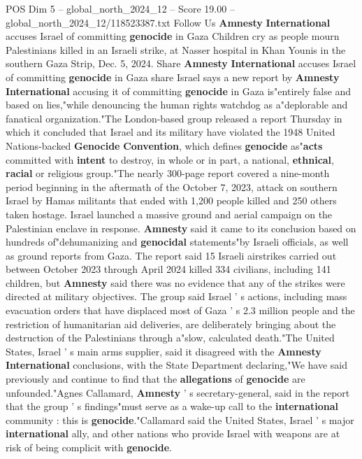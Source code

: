 \begin{textsample}{POS Dim 5 – global\_north\_2024\_12 – Score 19.00 – global\_north\_2024\_12/118523387.txt}  \label{ex:f5_pos_123}
Follow Us \textbf{Amnesty} \textbf{International} accuses Israel of committing \textbf{genocide} in Gaza Children cry as people mourn Palestinians killed in an Israeli strike, at Nasser hospital in Khan Younis in the southern Gaza Strip, Dec. 5, 2024.
Share \textbf{Amnesty} \textbf{International} accuses Israel of committing \textbf{genocide} in Gaza share Israel says a new report by \textbf{Amnesty} \textbf{International} accusing it of committing \textbf{genocide} in Gaza is"entirely false and based on lies,"while denouncing the human rights watchdog as a"deplorable and fanatical organization."The London-based group released a report Thursday in which it concluded that Israel and its military have violated the 1948 United Nations-backed \textbf{Genocide} \textbf{Convention}, which defines \textbf{genocide} as"\textbf{acts} committed with \textbf{intent} to destroy, in whole or in part, a national, \textbf{ethnical}, \textbf{racial} or religious group."The nearly 300-page report covered a nine-month period beginning in the aftermath of the October 7, 2023, attack on southern Israel by Hamas militants that ended with 1,200 people killed and 250 others taken hostage.
Israel launched a massive ground and aerial campaign on the Palestinian enclave in response. \textbf{Amnesty} said it came to its conclusion based on hundreds of"dehumanizing and \textbf{genocidal} statements"by Israeli officials, as well as ground reports from Gaza.
The report said 15 Israeli airstrikes carried out between October 2023 through April 2024 killed 334 civilians, including 141 children, but \textbf{Amnesty} said there was no evidence that any of the strikes were directed at military objectives.
The group said Israel ' s actions, including mass evacuation orders that have displaced most of Gaza ' s 2.3 million people and the restriction of humanitarian aid deliveries, are deliberately bringing about the destruction of the Palestinians through a"slow, calculated death."The United States, Israel ' s main arms supplier, said it disagreed with the \textbf{Amnesty} \textbf{International} conclusions, with the State Department declaring,"We have said previously and continue to find that the \textbf{allegations} of \textbf{genocide} are unfounded."Agnes Callamard, \textbf{Amnesty} ' s secretary-general, said in the report that the group ' s findings"must serve as a wake-up call to the \textbf{international} community : this is \textbf{genocide}."Callamard said the United States, Israel ' s major \textbf{international} ally, and other nations who provide Israel with weapons are at risk of being complicit with \textbf{genocide}.

\end{textsample}
